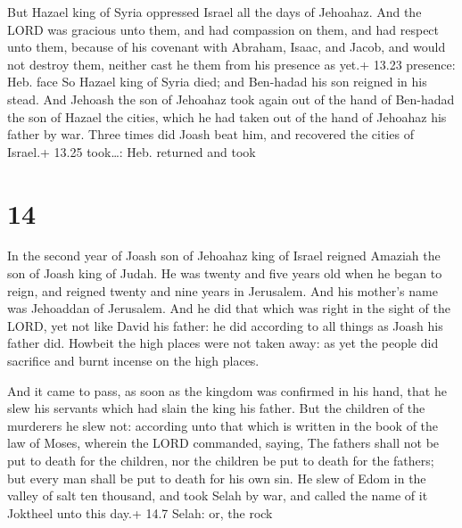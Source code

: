  But Hazael king of Syria oppressed Israel all the days
of Jehoahaz.  And the LORD was gracious unto them, and had
compassion on them, and had respect unto them, because of his covenant
with Abraham, Isaac, and Jacob, and would not destroy them, neither cast
he them from his presence as yet.+ 13.23 presence: Heb. face
 So Hazael king of Syria died; and Ben-hadad his son
reigned in his stead.  And Jehoash the son of Jehoahaz took
again out of the hand of Ben-hadad the son of Hazael the cities, which
he had taken out of the hand of Jehoahaz his father by war. Three times
did Joash beat him, and recovered the cities of Israel.+ 13.25
took\ldots: Heb. returned and took

\hypertarget{section-13}{%
\section{14}\label{section-13}}

 In the second year of Joash son of Jehoahaz king of Israel
reigned Amaziah the son of Joash king of Judah.  He was
twenty and five years old when he began to reign, and reigned twenty and
nine years in Jerusalem. And his mother's name was Jehoaddan of
Jerusalem.  And he did that which was right in the sight of
the LORD, yet not like David his father: he did according to all things
as Joash his father did.  Howbeit the high places were not
taken away: as yet the people did sacrifice and burnt incense on the
high places.

 And it came to pass, as soon as the kingdom was confirmed
in his hand, that he slew his servants which had slain the king his
father.  But the children of the murderers he slew not:
according unto that which is written in the book of the law of Moses,
wherein the LORD commanded, saying, The fathers shall not be put to
death for the children, nor the children be put to death for the
fathers; but every man shall be put to death for his own sin.
 He slew of Edom in the valley of salt ten thousand, and
took Selah by war, and called the name of it Joktheel unto this day.+
14.7 Selah: or, the rock


